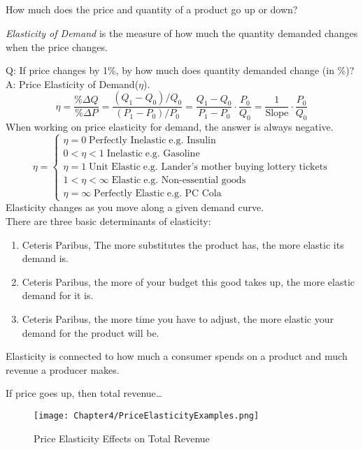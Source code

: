 \subsection{}

How much does the price and quantity of a product go up or down?
\begin{definition}
    \emph{Elasticity of Demand} is the measure of how much the quantity demanded changes when the price changes.
\end{definition}
Q: If price changes by 1\%, by how much does quantity demanded change (in \%)?\\
A: Price Elasticity of Demand($\eta$).\\
\begin{equation}
    \eta = \frac{\%\Delta Q}{\%\Delta P}=
    \frac{(Q_1 - Q_0)/Q_0}{(P_1 - P_0)/P_0}
    =\frac{Q_1 - Q_0}{P_1 - P_0} \cdot \frac{P_0}{Q_0}=\frac{1}{\text{Slope}}\cdot \frac{P_0}{Q_0}
\end{equation}
When working on price elasticity for demand, the answer is always negative.\\
\[
\eta = 
    \begin{cases}
        \eta = 0\; \text{Perfectly Inelastic}\; \text{e.g. Insulin}\\
        0 < \eta < 1\; \text{Inelastic}\; \text{e.g. Gasoline}\\
        \eta = 1\; \text{Unit Elastic}\; \text{e.g. Lander's mother buying lottery tickets}\\
        1 < \eta < \infty\; \text{Elastic}\; \text{e.g. Non-essential goods}\\
        \eta = \infty\; \text{Perfectly Elastic}\; \text{e.g. PC Cola}
    \end{cases}
\]
Elasticity changes as you move along a given demand curve.\\
There are three basic determinants of elasticity:
\begin{enumerate}
    \item Ceteris Paribus, The more substitutes the product has, the more elastic its demand is.
    \item Ceteris Paribus, the more of your budget this good takes up, the more elastic demand for it is.
    \item Ceteris Paribus, the more time you have to adjust, the more elastic your demand for the product will be.
\end{enumerate}
Elasticity is connected to how much a consumer spends on a product and much revenue a producer makes.
\begin{example}
    If price goes up, then total revenue\dots
    \begin{figure}[H]
        \centering
        \texttt{[image: Chapter4/PriceElasticityExamples.png]}
        \caption{Price Elasticity Effects on Total Revenue}
    \end{figure}
\end{example}
